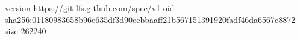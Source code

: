 version https://git-lfs.github.com/spec/v1
oid sha256:01180983658b96e635df3d90cebbaaff21b567151391920fadf46da6567e8872
size 262240
